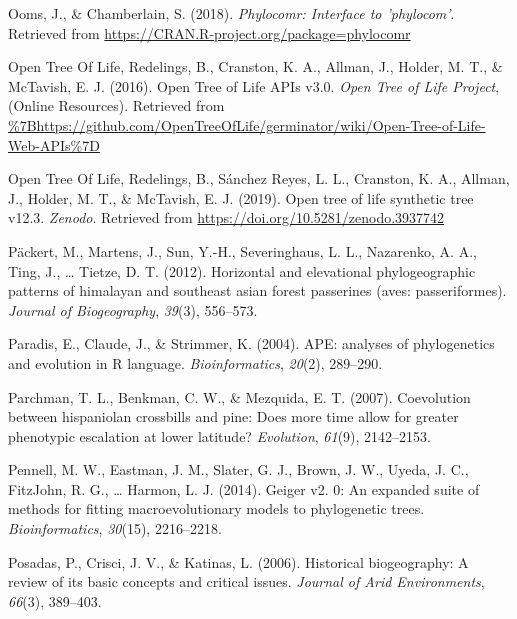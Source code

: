 \documentclass[
  man]{apa6}
\newlength{\cslhangindent}
\newlength{\cslentryspacingunit} %
\newenvironment{CSLReferences}[2] %
 {%
  \setlength{\parindent}{0pt}
  \ifodd #1
  \let\oldpar\par
  \def\par{\hangindent=\cslhangindent\oldpar}
  \fi
  \setlength{\parskip}{#2\cslentryspacingunit}
 }%
 {}
\begin{document}
\begin{CSLReferences}{1}{0}
\leavevmode{}%
Ooms, J., \& Chamberlain, S. (2018). \emph{Phylocomr: Interface to 'phylocom'}. Retrieved from \url{https://CRAN.R-project.org/package=phylocomr}

\leavevmode{}%
Open Tree Of Life, Redelings, B., Cranston, K. A., Allman, J., Holder, M. T., \& McTavish, E. J. (2016). {Open Tree of Life APIs v3.0}. \emph{{Open Tree of Life Project}}, (Online Resources). Retrieved from \url{\%7Bhttps://github.com/OpenTreeOfLife/germinator/wiki/Open-Tree-of-Life-Web-APIs\%7D}

\leavevmode{}%
Open Tree Of Life, Redelings, B., Sánchez Reyes, L. L., Cranston, K. A., Allman, J., Holder, M. T., \& McTavish, E. J. (2019). Open tree of life synthetic tree v12.3. \emph{Zenodo}. Retrieved from \url{https://doi.org/10.5281/zenodo.3937742}

\leavevmode{}%
Päckert, M., Martens, J., Sun, Y.-H., Severinghaus, L. L., Nazarenko, A. A., Ting, J., \ldots{} Tietze, D. T. (2012). Horizontal and elevational phylogeographic patterns of himalayan and southeast asian forest passerines (aves: passeriformes). \emph{Journal of Biogeography}, \emph{39}(3), 556--573.

\leavevmode{}%
Paradis, E., Claude, J., \& Strimmer, K. (2004). {APE: analyses of phylogenetics and evolution in R language}. \emph{Bioinformatics}, \emph{20}(2), 289--290.

\leavevmode{}%
Parchman, T. L., Benkman, C. W., \& Mezquida, E. T. (2007). Coevolution between hispaniolan crossbills and pine: Does more time allow for greater phenotypic escalation at lower latitude? \emph{Evolution}, \emph{61}(9), 2142--2153.

\leavevmode{}%
Pennell, M. W., Eastman, J. M., Slater, G. J., Brown, J. W., Uyeda, J. C., FitzJohn, R. G., \ldots{} Harmon, L. J. (2014). Geiger v2. 0: An expanded suite of methods for fitting macroevolutionary models to phylogenetic trees. \emph{Bioinformatics}, \emph{30}(15), 2216--2218.

\leavevmode{}%
Posadas, P., Crisci, J. V., \& Katinas, L. (2006). Historical biogeography: A review of its basic concepts and critical issues. \emph{{Journal of Arid Environments}}, \emph{66}(3), 389--403.


\end{CSLReferences}
\end{document}
